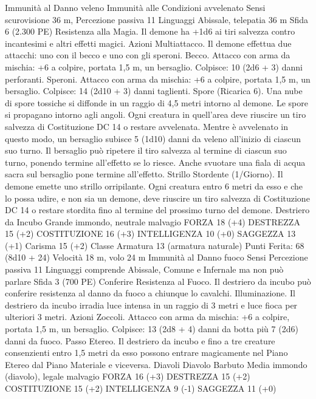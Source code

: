 \begin{multicols}{2}
Immunità al Danno veleno
Immunità alle Condizioni avvelenato
Sensi scurovisione 36 m, Percezione passiva 11
Linguaggi Abissale, telepatia 36 m
Sfida 6 (2.300 PE)
Resistenza alla Magia. Il demone ha +1d6 ai tiri salvezza
contro incantesimi e altri effetti magici.
Azioni
Multiattacco. Il demone effettua due attacchi: uno con il becco e
uno con gli speroni.
Becco. Attacco con arma da mischia: +6 a colpire, portata 1,5 m,
un bersaglio.
Colpisce: 10 (2d6 + 3) danni perforanti.
Speroni. Attacco con arma da mischia: +6 a colpire, portata 1,5
m, un bersaglio.
Colpisce: 14 (2d10 + 3) danni taglienti.
Spore (Ricarica 6). Una nube di spore tossiche si diffonde in un
raggio di 4,5 metri intorno al demone. Le spore si propagano
intorno agli angoli. Ogni creatura in quell’area deve riuscire un
tiro salvezza di Costituzione DC 14 o restare avvelenata. Mentre
è avvelenato in questo modo, un bersaglio subisce 5 (1d10) danni
da veleno all’inizio di ciascun suo turno. Il bersaglio può ripetere
il tiro salvezza al termine di ciascun suo turno, ponendo termine
all’effetto se lo riesce. Anche svuotare una fiala di acqua sacra
sul bersaglio pone termine all’effetto.
Strillo Stordente (1/Giorno). Il demone emette uno strillo
orripilante. Ogni creatura entro 6 metri da esso e che lo possa
udire, e non sia un demone, deve riuscire un tiro salvezza di
Costituzione DC 14 o restare stordita fino al termine del
prossimo turno del demone.
Destriero da Incubo
Grande immondo, neutrale malvagio
FORZA 18 (+4)
DESTREZZA 15 (+2)
COSTITUZIONE 16 (+3)
INTELLIGENZA 10 (+0)
SAGGEZZA 13 (+1)
Carisma 15 (+2)
Classe Armatura 13 (armatura naturale)
\hspace*{0pt}\hfill{Punti Ferita}: 68 (8d10 + 24)
Velocità 18 m, volo 24 m
Immunità al Danno fuoco
Sensi Percezione passiva 11
Linguaggi comprende Abissale, Comune e Infernale ma non può
parlare
Sfida 3 (700 PE)
Conferire Resistenza al Fuoco. Il destriero da incubo può
conferire resistenza al danno da fuoco a chiunque lo cavalchi.
Illuminazione. Il destriero da incubo irradia luce intensa in un
raggio di 3 metri e luce fioca per ulteriori 3 metri.
Azioni
Zoccoli. Attacco con arma da mischia: +6 a colpire, portata 1,5
m, un bersaglio.
Colpisce: 13 (2d8 + 4) danni da botta più 7 (2d6) danni da
fuoco.
Passo Etereo. Il destriero da incubo e fino a tre creature
consenzienti entro 1,5 metri da esso possono entrare
magicamente nel Piano Etereo dal Piano Materiale e viceversa.
Diavoli
Diavolo Barbuto
Media immondo (diavolo), legale malvagio
FORZA 16 (+3)
DESTREZZA 15 (+2)
COSTITUZIONE 15 (+2)
INTELLIGENZA 9 (-1)
SAGGEZZA 11 (+0)

\end{multicols}
